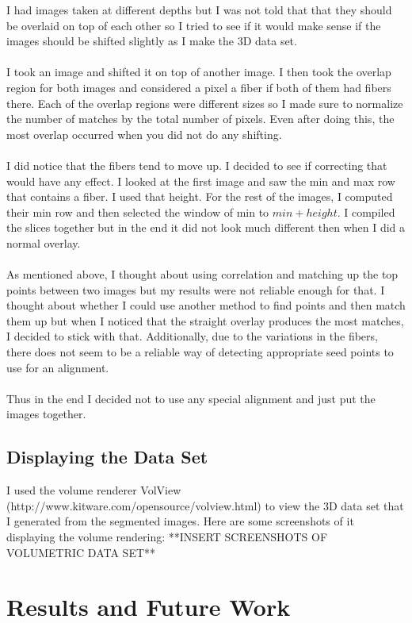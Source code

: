 \documentclass[11pt,psfig]{article}
\begin{document}
I had images taken at different depths but I was not told that that they should be overlaid on top of each other so I tried to see if it would make sense if the images should be shifted slightly as I make the 3D data set. \\
\\
I took an image and shifted it on top of another image. I then took the overlap region for both images and considered a pixel a fiber if both of them had fibers there. Each of the overlap regions were different sizes so I made sure to normalize the number of matches by the total number of pixels. Even after doing this, the most overlap occurred when you did not do any shifting. \\
\\
I did notice that the fibers tend to move up. I decided to see if correcting that would have any effect. I looked at the first image and saw the min and max row that contains a fiber. I used that height. For the rest of the images, I computed their min row and then selected the window of min to $min+height$. I compiled the slices together but in the end it did not look much different then when I did a normal overlay. \\
\\
As mentioned above, I thought about using correlation and matching up the top points between two images but my results were not reliable enough for that. I thought about whether I could use another method to find points and then match them up but when I noticed that the straight overlay produces the most matches, I decided to stick with that. Additionally, due to the variations in the fibers, there does not seem to be a reliable way of detecting appropriate seed points to use for an alignment. \\
\\
Thus in the end I decided not to use any special alignment and just put the images together. 

\subsection{Displaying the Data Set}

I used the volume renderer VolView (http://www.kitware.com/opensource/volview.html) to view the 3D data set that I generated from the segmented images. Here are some screenshots of it displaying the volume rendering:
**INSERT SCREENSHOTS OF VOLUMETRIC DATA SET**

\section{Results and Future Work}
\end{document}
